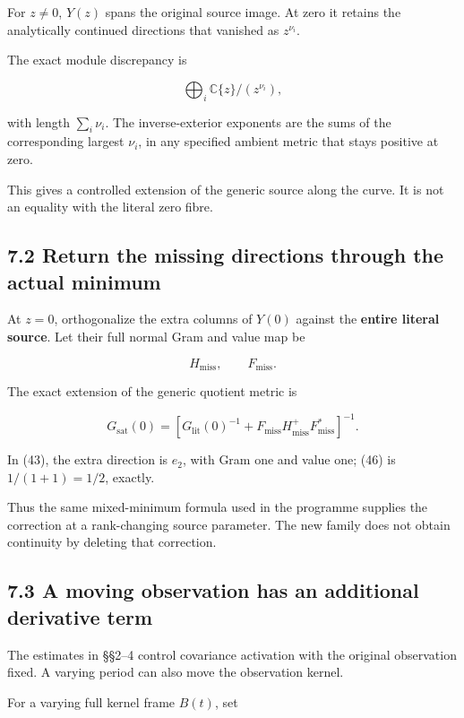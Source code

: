 For \(z\ne0\), \(Y(z)\) spans the original source image. At zero it retains the analytically continued directions that vanished as \(z^{\nu_i}\).

The exact module discrepancy is

\[
\boxed{
\bigoplus_i\mathbb C\{z\}/(z^{\nu_i}),
}
\tag{45}
\]

with length \(\sum_i\nu_i\). The inverse-exterior exponents are the sums of the corresponding largest \(\nu_i\), in any specified ambient metric that stays positive at zero.

This gives a controlled extension of the generic source along the curve. It is not an equality with the literal zero fibre.

\subsection{7.2 Return the missing directions through the actual minimum}\label{return-the-missing-directions-through-the-actual-minimum}

At \(z=0\), orthogonalize the extra columns of \(Y(0)\) against the \textbf{entire literal source}. Let their full normal Gram and value map be

\[
H_{\mathrm{miss}},\qquad F_{\mathrm{miss}}.
\]

The exact extension of the generic quotient metric is

\[
\boxed{
G_{\mathrm{sat}}(0)
=
\left[
G_{\mathrm{lit}}(0)^{-1}
+
F_{\mathrm{miss}}H_{\mathrm{miss}}^+
F_{\mathrm{miss}}^*
\right]^{-1}.
}
\tag{46}
\]

In (43), the extra direction is \(e_2\), with Gram one and value one; (46) is \(1/(1+1)=1/2\), exactly.

Thus the same mixed-minimum formula used in the programme supplies the correction at a rank-changing source parameter. The new family does not obtain continuity by deleting that correction.

\subsection{7.3 A moving observation has an additional derivative term}\label{a-moving-observation-has-an-additional-derivative-term}

The estimates in §§2--4 control covariance activation with the original observation fixed. A varying period can also move the observation kernel.

For a varying full kernel frame \(B(t)\), set

